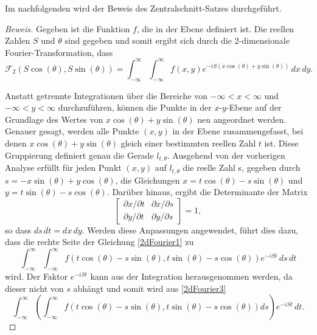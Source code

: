 Im nachfolgenden wird der Beweis des Zentralschnitt-Satzes durchgeführt. 
\begin{proof}[Beweis]
	Gegeben ist die Funktion $f$, die in der Ebene definiert ist. Die reellen Zahlen $S$ und $\theta$ sind gegeben und somit ergibt sich durch die 2-dimensionale Fourier-Transformation, dass
	\begin{equation}\label{2dFourier2}
		\mathscr{F}_2(S\cos(\theta), S\sin(\theta)) = \int_{-\infty}^{\infty}\int_{-\infty}^{\infty} f(x, y)e^{-iS(x\cos(\theta)+y\sin(\theta))} \,dx\,dy.
	\end{equation}
	
	Anstatt getrennte Integrationen über die Bereiche von $-\infty < x < \infty $ und $-\infty < y < \infty$ durchzuführen, können die Punkte in der $x$-$y$-Ebene auf der Grundlage des Wertes von $x\cos(\theta) + y\sin(\theta)$ neu angeordnet werden. Genauer gesagt, werden alle Punkte $(x, y)$ in der Ebene zusammengefasst, bei denen $x\cos(\theta) + y\sin(\theta)$ gleich einer bestimmten reellen Zahl $t$ ist. Diese Gruppierung definiert genau die Gerade $l_{t,\theta}$. Ausgehend von der vorherigen Analyse erfüllt für jeden Punkt $(x, y)$ auf $l_{t,\theta}$ die reelle Zahl s, gegeben durch $s = -x\sin(\theta) + y\cos(\theta)$, die Gleichungen $x = t\cos(\theta) - s\sin(\theta)$ und $y = t\sin(\theta) - s\cos(\theta)$. Darüber hinaus, ergibt die Determinante der Matrix \begin{equation}
		\begin{bmatrix} \partial x / \partial t & \partial x /\partial s \\
			\partial y /\partial t & \partial y /\partial s \end{bmatrix} = 1,
	\nonumber \end{equation}
	 so dass $ds\,dt = dx\,dy$.
	Werden diese Anpassungen angewendet, führt dies dazu, dass die rechte Seite der Gleichung \eqref{2dFourier1} zu
	\begin{equation}\label{2dFourier3}
		\int_{-\infty}^{\infty}\int_{-\infty}^{\infty} f(t\cos(\theta) - s\sin(\theta), t\sin(\theta) - s\cos(\theta))e^{-iSt}\,ds\,dt
	\end{equation}
	wird. Der Faktor $e^{-iSt}$ kann aus der Integration herausgenommen werden, da dieser nicht von $s$ abhängt und somit wird aus \eqref{2dFourier3}
	\begin{equation}\label{fourier2radon}
		\int_{-\infty}^{\infty} \left(\int_{-\infty}^{\infty} f(t\cos(\theta) - s\sin(\theta), t\sin(\theta) - s\cos(\theta))ds\right) e^{-iSt}\,dt.
	\end{equation}

\end{proof}
